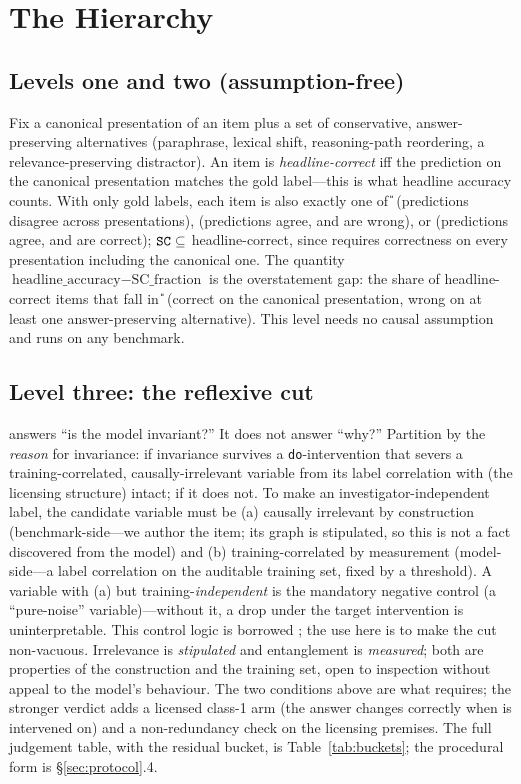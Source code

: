 \section{The Hierarchy}\label{sec:hierarchy}

\subsection{Levels one and two (assumption-free)}
Fix a canonical presentation of an item plus a set of conservative,
answer-preserving alternatives (paraphrase, lexical shift, reasoning-path
reordering, a relevance-preserving distractor). An item is
\emph{headline-correct} iff the prediction on the canonical presentation
matches the gold label---this is what headline accuracy counts. With only
gold labels, each item is also exactly one of \U{} (predictions disagree
across presentations), \SW{} (predictions agree, and are wrong), or \SC{}
(predictions agree, and are correct); $\texttt{SC}{} \subseteq$
headline-correct, since \SC{} requires correctness on every presentation
including the canonical one. The quantity
$\text{headline\_accuracy} - \text{SC\_fraction}$ is the overstatement
gap: the share of headline-correct items that fall in \U{} (correct on
the canonical presentation, wrong on at least one answer-preserving
alternative). This level needs no causal assumption and runs on any
benchmark.

\subsection{Level three: the reflexive cut}\label{sec:cut}
\SC{} answers ``is the model invariant?'' It does not answer ``why?''
Partition \SC{} by the \emph{reason} for invariance: \scg{} if invariance
survives a \texttt{do}-intervention that severs a training-correlated,
causally-irrelevant variable from its label correlation with \Mstr{} (the
licensing structure) intact; \scs{} if it does not. To make \scs{} an
investigator-independent label, the candidate variable must be (a)
causally irrelevant by construction (benchmark-side---we author the
item; its graph is stipulated, so this is not a fact discovered from the model)
and (b) training-correlated by measurement (model-side---a label
correlation on the auditable training set, fixed by a threshold). A variable
with (a) but training-\emph{independent} is the mandatory negative
control (a ``pure-noise'' variable)---without it, a drop under the target
intervention is uninterpretable. This control logic is borrowed
\citep{hewitt2019control,lipsitch2010negative}; the use here is to make the \SC{}
cut non-vacuous. Irrelevance is \emph{stipulated} and entanglement is
\emph{measured}; both are properties of the construction and the training
set, open to inspection without appeal to the model's behaviour. The two
conditions above are what \scs{} requires; the stronger \scg{} verdict adds
a licensed class-1 arm (the answer changes correctly when \Mstr{} is
intervened on) and a non-redundancy check on the licensing premises. The
full judgement table, with the residual \scu{} bucket, is
Table~\ref{tab:buckets}; the procedural form is \S\ref{sec:protocol}.4.

